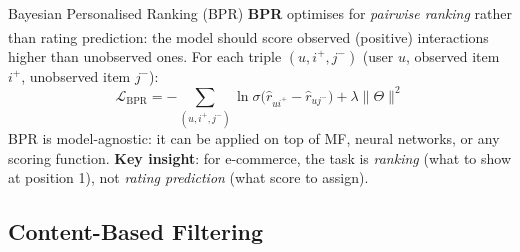 \begin{v3topic}{Bayesian Personalised Ranking (BPR)}
    \textbf{BPR} optimises for \emph{pairwise ranking} rather than rating prediction\textsuperscript{\cite[][p.~1]{rendleBPRBayesianPersonalized2009}}: the model should score observed (positive) interactions higher than unobserved ones.
    For each triple $(u, i^+, j^-)$ (user $u$, observed item $i^+$, unobserved item $j^-$):
    \begin{equation}
        \mathcal{L}_{\text{BPR}} = -\sum_{(u,i^+,j^-)} \ln\sigma\!\bigl(\hat{r}_{ui^+} - \hat{r}_{uj^-}\bigr) + \lambda \|\Theta\|^2
    \end{equation}
    BPR is model-agnostic: it can be applied on top of MF, neural networks, or any scoring function.
    \textbf{Key insight}: for e-commerce, the task is \emph{ranking} (what to show at position 1), not \emph{rating prediction} (what score to assign).

\end{v3topic}

\subsection{Content-Based Filtering}


